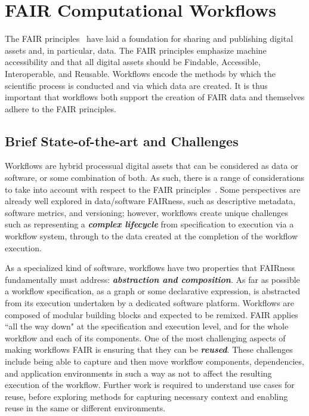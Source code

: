 \section{FAIR Computational Workflows}
\label{sec:fair}

The FAIR principles~\cite{wilkinson2016fair} have laid a foundation for sharing and publishing digital assets and, in particular, data. The FAIR principles emphasize machine accessibility and that all digital assets should be Findable, Accessible, Interoperable, and Reusable. Workflows encode the methods by which the scientific process is conducted and via which data are created. It is thus important that workflows both support the creation of FAIR data and themselves adhere to the FAIR principles.


\subsection{Brief State-of-the-art and Challenges}

Workflows are hybrid processual digital assets that can be considered as data or software, or some combination of both. As such, there is a range of considerations to take into account with respect to the FAIR principles~\cite{goble2020}. Some perspectives are already well explored in data/software FAIRness, such as descriptive metadata, software metrics, and versioning; however, workflows create unique challenges such as representing a \textbf{\emph{complex lifecycle}} from specification to execution via a workflow system, through to the data created at the completion of the workflow execution.

As a specialized kind of software, workflows have two properties that FAIRness fundamentally must address: \textbf{\emph{abstraction and composition}}. As far as possible a workflow specification, as a graph or some declarative expression, is abstracted from its execution undertaken by a dedicated software platform. Workflows are composed of modular building blocks and expected to be remixed. FAIR applies ``all the way down" at the specification and execution level, and for the whole workflow and each of its components. One of the most challenging aspects of making workflows FAIR is ensuring that they can be \textbf{\emph{reused}}. These challenges include being able to capture and then move workflow components, dependencies, and application environments in such a way as not to  affect the resulting execution of the workflow. Further work is required to understand use cases for reuse, before exploring methods for capturing necessary context and enabling reuse in the same or different environments. 

